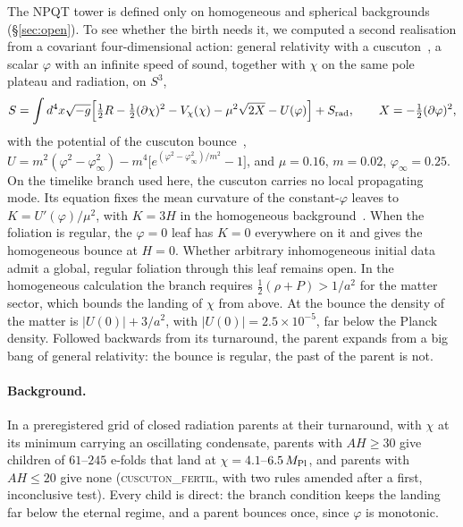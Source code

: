\documentclass[11pt,a4paper]{article}
\newcommand{\Mpl}{M_{\rm Pl}}
\begin{document}
The NPQT tower is defined only on homogeneous and spherical backgrounds (\S\ref{sec:open}).
To see whether the birth needs it, we computed a second realisation from a covariant four-dimensional action: general relativity with a cuscuton~\cite{AfshordiChungGeshnizjani2007,Afshordi2007cosmology}, a scalar $\varphi$ with an infinite speed of sound, together with $\chi$ on the same pole plateau and radiation, on $S^3$,
\begin{equation}
S=\int d^4x\sqrt{-g}\Big[\tfrac12R-\tfrac12(\partial\chi)^2-V_\chi(\chi)-\mu^2\sqrt{2X}-U(\varphi)\Big]+S_{\rm rad},\qquad X=-\tfrac12(\partial\varphi)^2,
\label{eq:cuscuton}
\end{equation}
with the potential of the cuscuton bounce~\cite{Boruah2018bounce}, $U=m^2(\varphi^2-\varphi_\infty^2)-m^4\big[e^{(\varphi^2-\varphi_\infty^2)/m^2}-1\big]$, and $\mu=0.16$, $m=0.02$, $\varphi_\infty=0.25$.
On the timelike branch used here, the cuscuton carries no local propagating mode. Its equation fixes the mean curvature of the constant-$\varphi$ leaves to $K=U'(\varphi)/\mu^2$, with $K=3H$ in the homogeneous background~\cite{Afshordi2009}.
When the foliation is regular, the $\varphi=0$ leaf has $K=0$ everywhere on it and gives the homogeneous bounce at $H=0$. Whether arbitrary inhomogeneous initial data admit a global, regular foliation through this leaf remains open. In the homogeneous calculation the branch requires $\tfrac12(\rho+P)>1/a^2$ for the matter sector, which bounds the landing of $\chi$ from above.
At the bounce the density of the matter is $|U(0)|+3/a^2$, with $|U(0)|=2.5\times10^{-5}$, far below the Planck density.
Followed backwards from its turnaround, the parent expands from a big bang of general relativity: the bounce is regular, the past of the parent is not.

\paragraph{Background.}
In a preregistered grid of closed radiation parents at their turnaround, with $\chi$ at its minimum carrying an oscillating condensate, parents with $AH\ge30$ give children of $61$--$245$ e-folds that land at $\chi=4.1$--$6.5\,\Mpl$, and parents with $AH\le20$ give none (\textsc{cuscuton\_fertil}, with two rules amended after a first, inconclusive test).
Every child is direct: the branch condition keeps the landing far below the eternal regime, and a parent bounces once, since $\varphi$ is monotonic.
\end{document}
